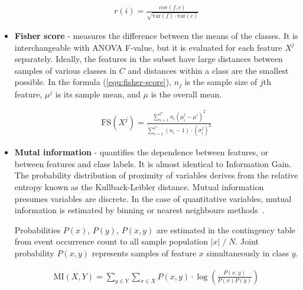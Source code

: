 \begin{itemize}
\begin{ceqn}\begin{align}
r(i) = \frac{\mathrm{cov}(f, c)}{\sqrt{\mathrm{var}(f) \cdot \mathrm{var}(c)}}
\end{align}\end{ceqn}


\item \textbf{Fisher score} - measures the difference between the means of the classes. It is interchangeable with ANOVA F-value, but it is evaluated for each feature $X^j$ separately. Ideally, the features in the subset have large distances between samples of various classes in $C$ and distances within a class are the smallest possible. In the formula (\ref{equ:fisher-score}), $n_j$ is the sample size of $j$th feature, $\mu^j$ is its sample mean, and $\mu$ is the overall mean.

\begin{ceqn}\begin{align}
\mathrm{FS}(X^j) = \frac{\sum_{i=1}^{C} n_i(\mu_i^j - \mu^i)^2}{\sum_{i=1}^{C} (n_i - 1) \cdot (\sigma_i^j)^2}
\label{equ:fisher-score}
\end{align}\end{ceqn}

\item \textbf{Mutal information} - quantifies the dependence between features, or between features and class labels. It is almost identical to Information Gain. The probability distribution of proximity of variables derives from the relative entropy known as the Kullback-Leibler distance. Mutual information presumes variables are discrete. In the case of quantitative variables, mutual information is estimated by binning or nearest neighbours methods~\cite{ross_mutual_2014}.

Probabilities $P(x)$, $P(y)$, $P(x, y)$ are estimated in the contingency table from event occurrence count to all sample population $|x|\;/\;N$. Joint probability $P(x, y)$ represents samples of feature $x$ simultaneously in class $y$.

\begin{ceqn}\begin{align}
\mathrm{MI}(X, Y) = \sum_{y \in Y} \sum_{x \in X} P(x, y) \cdot \log\left(\frac{P(x, y)}{P(x)P(y)}\right)
\end{align}\end{ceqn}
\end{itemize}

